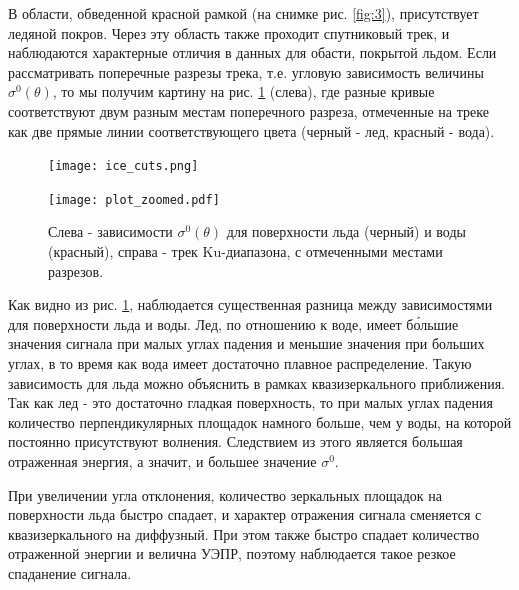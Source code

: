 В области, обведенной красной рамкой (на снимке рис. \ref{fig:3}), присутствует ледяной покров. Через эту область также
проходит спутниковый трек, и наблюдаются характерные отличия в данных для обасти, покрытой льдом. Если рассматривать
поперечные
разрезы трека, т.е. угловую зависимость величины $\sigma^0(\theta)$, то мы получим картину на рис. \ref{fig:4} (слева), где
разные кривые соответствуют двум разным местам поперечного разреза, отмеченные на треке как две прямые линии
соответствующего цвета (черный - лед, красный - вода).

\begin{figure}[h!]
  \centering
  \begin{minipage}{.49\linewidth}
    \texttt{[image: ice\_cuts.png]}
  \end{minipage}
  \begin{minipage}{.49\linewidth}
    \texttt{[image: plot\_zoomed.pdf]}
  \end{minipage}
  \caption{Слева - зависимости $\sigma^0(\theta)$ для поверхности льда (черный) и воды (красный), справа - трек Ku-диапазона, с отмеченными местами разрезов. }
  \label{fig:4}
\end{figure}

Как видно из рис. \ref{fig:4}, наблюдается существенная разница между зависимостями для поверхности льда и воды. Лед, по
отношению к воде, имеет б\'{о}льшие значения сигнала при малых углах падения и меньшие значения при больших углах, в то время как вода
имеет достаточно плавное распределение. Такую зависимость для льда можно объяснить в рамках
квазизеркального приближения. Так как лед - это достаточно гладкая поверхность, то при малых углах падения количество
перпендикулярных площадок намного больше, чем у воды, на которой постоянно присутствуют волнения. Следствием из этого
является большая отраженная энергия, а значит, и большее значение $\sigma^0$. 

При увеличении угла отклонения, количество зеркальных площадок на поверхности льда быстро спадает, и характер отражения сигнала
сменяется с квазизеркального на диффузный. При этом также быстро спадает количество отраженной энергии и велична УЭПР,
поэтому наблюдается такое резкое спаданение сигнала.

